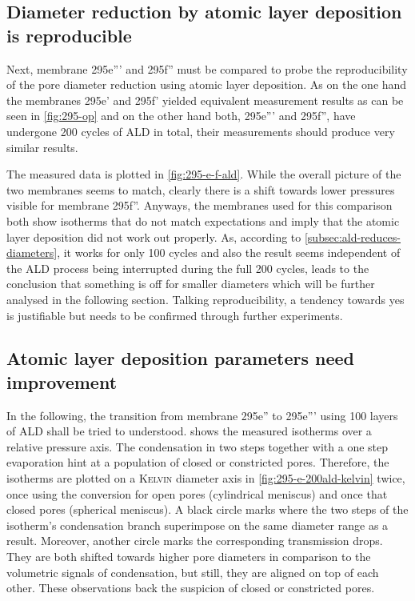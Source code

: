 \documentclass[../thesis.tex]{subfiles}
\begin{document}
        \subsection{Diameter reduction by atomic layer deposition is reproducible}
        \label{subsec:diameter-reduction-reproducible}

          Next, membrane 295e''' and 295f'' must be compared to probe the reproducibility of the pore diameter reduction using atomic layer deposition. As on the one hand the membranes 295e' and 295f' yielded equivalent measurement results as can be seen in \cref{fig:295-op} and on the other hand both, 295e''' and 295f'', have undergone 200 cycles of ALD in total, their measurements should produce very similar results.

          The measured data is plotted in \cref{fig:295-e-f-ald}. While the overall picture of the two membranes seems to match, clearly there is a shift towards lower pressures visible for membrane 295f''. Anyways, the membranes used for this comparison both show isotherms that do not match expectations and imply that the atomic layer deposition did not work out properly. As, according to \cref{subsec:ald-reduces-diameters}, it works for only 100 cycles and also the result seems independent of the ALD process being interrupted during the full 200 cycles, leads to the conclusion that something is off for smaller diameters which will be further analysed in the following section. Talking reproducibility, a tendency towards yes is justifiable but needs to be confirmed through further experiments.

          

          \subsection{Atomic layer deposition parameters need improvement}
          \label{parameters-need-improvement}

            

            In the following, the transition from membrane 295e'' to 295e''' using 100 layers of ALD shall be tried to understood.  shows the measured isotherms over a relative pressure axis. The condensation in two steps together with a one step evaporation hint at a population of closed or constricted pores. Therefore, the isotherms are plotted on a \textsc{Kelvin} diameter axis in \cref{fig:295-e-200ald-kelvin} twice, once using the conversion for open pores (cylindrical meniscus) and once that closed pores (spherical meniscus). A black circle marks where the two steps of the isotherm's condensation branch superimpose on the same diameter range as a result. Moreover, another circle marks the corresponding transmission drops. They are both shifted towards higher pore diameters in comparison to the volumetric signals of condensation, but still, they are aligned on top of each other. These observations back the suspicion of closed or constricted pores.
            \medskip
\end{document}
